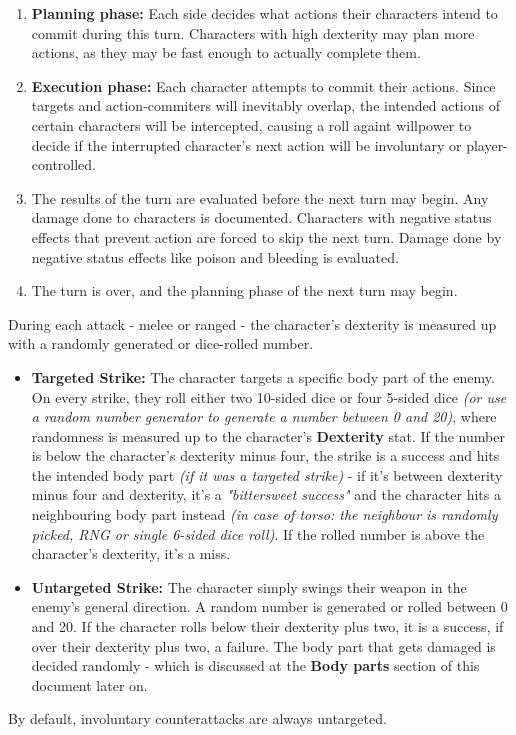 \documentclass[tikz,openany,11pt,a4paper]{book}
\begin{document}
\begin{enumerate}
  \item \textbf{Planning phase:} Each side decides what actions their characters intend to commit during this turn. Characters with high dexterity may plan more actions, as they may be fast enough to actually complete them.
  \item \textbf{Execution phase:} Each character attempts to commit their actions. Since targets and action-commiters will inevitably overlap, the intended actions of certain characters will be intercepted, causing a roll againt willpower to decide if the interrupted character's next action will be involuntary or player-controlled.
  \item The results of the turn are evaluated before the next turn may begin. Any damage done to characters is documented. Characters with negative status effects that prevent action are forced to skip the next turn. Damage done by negative status effects like poison and bleeding is evaluated.
  \item The turn is over, and the planning phase of the next turn may begin.
\end{enumerate}
During each attack - melee or ranged - the character's dexterity is measured up with a randomly generated or dice-rolled number.
\begin{itemize}
\item \textbf{Targeted Strike:} The character targets a specific body part of the enemy. On every strike, they roll either two 10-sided dice or four 5-sided dice \textit{(or use a random number generator to generate a number between 0 and 20)}, where randomness is measured up to the character's \textbf{Dexterity} stat. If the number is below the character's dexterity minus four, the strike is a success and hits the intended body part \textit{(if it was a targeted strike)} - if it's between dexterity minus four and dexterity, it's a \textit{"bittersweet success"} and the character hits a neighbouring body part instead \textit{(in case of torso: the neighbour is randomly picked, RNG or single 6-sided dice roll)}. If the rolled number is above the character's dexterity, it's a miss.
\item \textbf{Untargeted Strike:} The character simply swings their weapon in the enemy's general direction. A random number is generated or rolled between 0 and 20. If the character rolls below their dexterity plus two, it is a success, if over their dexterity plus two, a failure. The body part that gets damaged is decided randomly - which is discussed at the \textbf{Body parts} section of this document later on.
\end{itemize}
By default, involuntary counterattacks are always untargeted.
\end{document}

